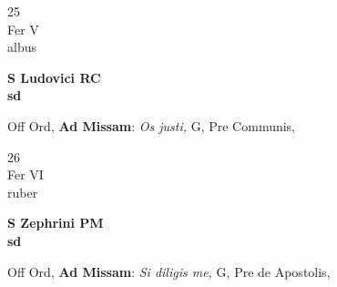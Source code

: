 \documentclass[10pt, openany]{book}
\begin{document}
        \begin{center}
            \begin{minipage}{3.5in}
                \vspace{2em}
                \begin{minipage}{0.5in}
                    {\Huge 25} \\
                    {\normalsize Fer V} \\
                    {\normalsize albus}
                \end{minipage}
                \begin{minipage}{3.0in}
                    \textbf{ \large S Ludovici RC \\
                    \textnormal{\normalsize sd}} \\ 
                \end{minipage}
                \begin{justify}Off Ord, \textbf{Ad Missam}: \textit{Os justi,} G, Pre Communis,   
                \end{justify}
            \end{minipage}
        \end{center}
    
        \begin{center}
            \begin{minipage}{3.5in}
                \vspace{2em}
                \begin{minipage}{0.5in}
                    {\Huge 26} \\
                    {\normalsize Fer VI} \\
                    {\normalsize ruber}
                \end{minipage}
                \begin{minipage}{3.0in}
                    \textbf{ \large S Zephrini PM \\
                    \textnormal{\normalsize sd}} \\ 
                \end{minipage}
                \begin{justify}Off Ord, \textbf{Ad Missam}: \textit{Si diligis me,} G, Pre de Apostolis,   
                \end{justify}
            \end{minipage}
        \end{center}
    
\end{document}

